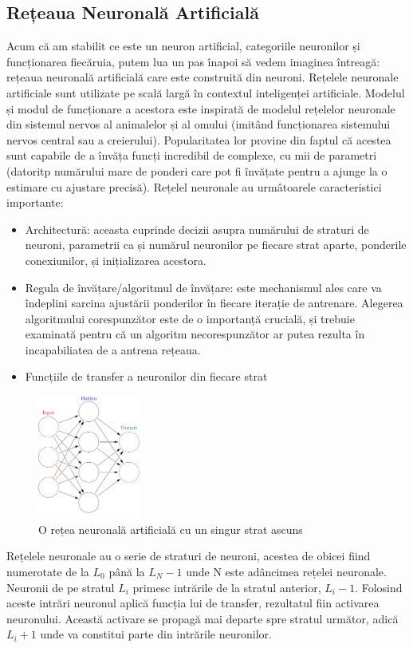\subsection{Rețeaua Neuronală Artificială}
Acum că am stabilit ce este un neuron artificial, categoriile neuronilor și funcționarea fiecăruia, putem lua un pas înapoi să vedem imaginea întreagă: rețeaua neuronală artificială care este construită din neuroni.\newline
Rețelele neuronale artificiale sunt utilizate pe scală largă în contextul inteligenței artificiale. Modelul și modul de funcționare a acestora este inspirată de modelul rețelelor neuronale din sistemul nervos al animalelor și al omului (imitând funcționarea sistemului nervos central sau a creierului).\newline
Popularitatea lor provine din faptul că acestea sunt capabile de a învăța funcți incredibil de complexe, cu mii de parametri (datoritp numărului mare de ponderi care pot fi învățate pentru a ajunge la o estimare cu ajustare precisă). Rețelel neuronale au urmâtoarele caracteristici importante:
\begin{itemize}
	\item Architectură: aceasta cuprinde decizii asupra numărului de straturi de neuroni, parametrii ca și numărul neuronilor pe fiecare strat aparte, ponderile conexiunilor, și inițializarea acestora.
	\item Regula de învățare/algoritmul de învățare: este mechanismul ales care va îndeplini sarcina ajustării ponderilor în fiecare iterație de antrenare. Alegerea algoritmului corespunzător este de o importanță crucială, și trebuie examinată pentru că un algoritm necorespunzător ar putea rezulta în incapabiliatea de a antrena rețeaua.
	\item Funcțiile de transfer a neuronilor din fiecare strat
\end{itemize}

\begin{figure}[h!]
    	\centering
	\captionsetup{justification=centering, margin=2cm}
	\includegraphics[width=0.3\textwidth]{figures/artificialneunet_1hidden.png}
	\caption{O rețea neuronală artificială cu un singur strat ascuns \cite{arn}}
	\label{fig:activationFunctions}
\end{figure}
Rețelele neuronale au o serie de straturi de neuroni, acestea de obicei fiind numerotate de la $L_0$ până la $L_N-1$ unde N este adâncimea rețelei neuronale. Neuronii de pe stratul $L_i$ primesc intrările de la stratul anterior, $L_i-1$. Folosind aceste intrări neuronul aplică funcția lui de transfer, rezultatul fiin activarea neuronului. Această activare se propagă mai departe spre stratul următor, adică $L_i+1$ unde va constitui parte din intrările neuronilor.


